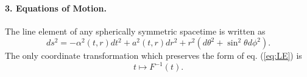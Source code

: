 



\paragraph*{3. Equations of Motion. }
\label{SS}
The line element of any spherically symmetric spacetime is written as
\begin{equation}
\label{eq:LE}
        ds^2=-\alpha^2(t,r)dt^2+a^2(t,r)dr^2+r^2 (d\theta^2+\sin^2\theta
d\phi^2).
\end{equation}
The only coordinate transformation which preserves the form of eq.
(\ref{eq:LE}) is
\begin{equation}
\label{eq:CT}
        t\mapsto F^{-1}(t).
\end{equation}

